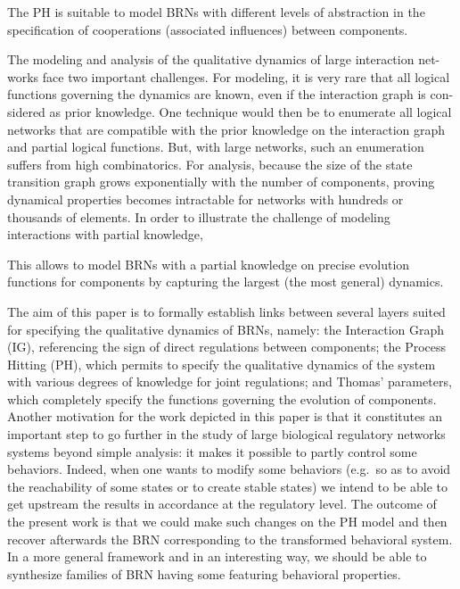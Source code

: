 The PH is suitable to model BRNs with different levels of abstraction in the specification of
cooperations (associated influences) between components.   

The modeling and analysis of the qualitative dynamics of large interaction net- works face two important challenges. For modeling, it is very rare that all logical functions governing the dynamics are known, even if the interaction graph is con- sidered as prior knowledge. One technique would then be to enumerate all logical networks that are compatible with the prior knowledge on the interaction graph and partial logical functions. But, with large networks, such an enumeration suffers from high combinatorics. For analysis, because the size of the state transition graph grows exponentially with the number of components, proving dynamical properties becomes intractable for networks with hundreds or thousands of elements.
In order to illustrate the challenge of modeling interactions with partial knowledge,

This allows to model BRNs with a partial knowledge on precise evolution functions for components
by capturing the largest (the most general) dynamics.

\medskip

The aim of this paper is to formally establish links between several layers suited for specifying the
qualitative dynamics of BRNs, namely:
the Interaction Graph (IG), referencing the sign of direct regulations between components;
the Process Hitting (PH), which permits to specify the qualitative dynamics of the system with
various degrees of knowledge for joint regulations;
and Thomas' parameters, which completely specify the functions governing the evolution of
components.
Another motivation for the work depicted in this paper is that it constitutes an important step
to go further in the study of large biological regulatory networks systems beyond simple analysis:
it makes it possible to partly control some behaviors.
Indeed, when one wants to modify some behaviors
(e.g.~so as to avoid the reachability of some states or to create stable states)
we intend to be able to get upstream the results in accordance at the regulatory level.
The outcome of the present work is that we could make such changes on the PH model
and then recover afterwards the BRN corresponding to the transformed behavioral system.
In a more general framework and in an interesting way,
we should be able to synthesize families of BRN having some featuring behavioral properties.

